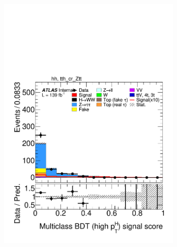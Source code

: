 \begin{figure}[h]
  \begin{subfigure}[b]{0.32\textwidth}
    \includegraphics[width=\textwidth]{images/sr_cr_plots/plot_tth_signal_multiclass_gt200_hh_tth_cr_Ztt.pdf}
    \caption{}
  \end{subfigure}
  \begin{subfigure}[b]{0.32\textwidth}

\end{subfigure}
\end{figure}
